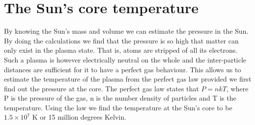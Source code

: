 \documentclass{../template/texnote}
\begin{document}
\section{The Sun's core temperature}
By knowing the Sun's mass and volume we can estimate the pressure in the Sun.
By doing the calculations we find that the pressure is so high that matter can only exist in the plasma state.
That is, atoms are stripped of all its electrons.
Such a plasma is however electrically neutral on the whole and the inter-particle distances are sufficient for it to have a perfect gas behaviour.
This allows us to estimate the temperature of the plasma from the perfect gas law provided we first find out the pressure at the core.
The perfect gas law states that $ P = nkT$, where P is the pressure of the gas, n is the number density of particles and T is the temperature.
Using the law we find the temperature at the Sun's core to be $ 1.5 \times 10^7 $ K or 15 million degrees Kelvin.


\end{document}

